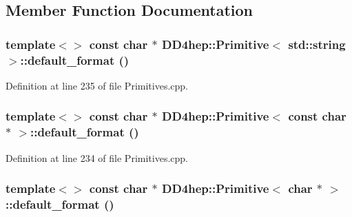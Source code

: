 \subsection{Member Function Documentation}
\hypertarget{struct_d_d4hep_1_1_primitive_a28601844d9c59585b654e55746d571a7}{
\subsubsection[{default\_\-format}]{\setlength{\rightskip}{0pt plus 5cm}template$<$$>$ const char $\ast$ {\bf DD4hep::Primitive}$<$ std::string $>$::default\_\-format ()}}
\label{struct_d_d4hep_1_1_primitive_a28601844d9c59585b654e55746d571a7}


Definition at line 235 of file Primitives.cpp.\hypertarget{struct_d_d4hep_1_1_primitive_a0367c6b91b193c28a8ef1ad835eca551}{
\subsubsection[{default\_\-format}]{\setlength{\rightskip}{0pt plus 5cm}template$<$$>$ const char $\ast$ {\bf DD4hep::Primitive}$<$ const char $\ast$ $>$::default\_\-format ()}}
\label{struct_d_d4hep_1_1_primitive_a0367c6b91b193c28a8ef1ad835eca551}


Definition at line 234 of file Primitives.cpp.\hypertarget{struct_d_d4hep_1_1_primitive_a464da9a73ca2751bea50801562e6019d}{
\subsubsection[{default\_\-format}]{\setlength{\rightskip}{0pt plus 5cm}template$<$$>$ const char $\ast$ {\bf DD4hep::Primitive}$<$ char $\ast$ $>$::default\_\-format ()}}
\label{struct_d_d4hep_1_1_primitive_a464da9a73ca2751bea50801562e6019d}


